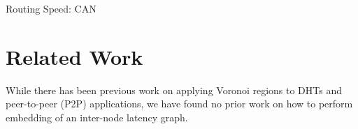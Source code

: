 \documentclass[11pt, conference, letterpaper]{IEEEtran}
\begin{document}


Routing Speed: CAN

\section{Related Work}
\label{sec:related}
While there has been previous work on applying Voronoi regions to DHTs and peer-to-peer (P2P) applications, we have found no prior work on how to perform embedding of an inter-node latency graph.   
\end{document}
